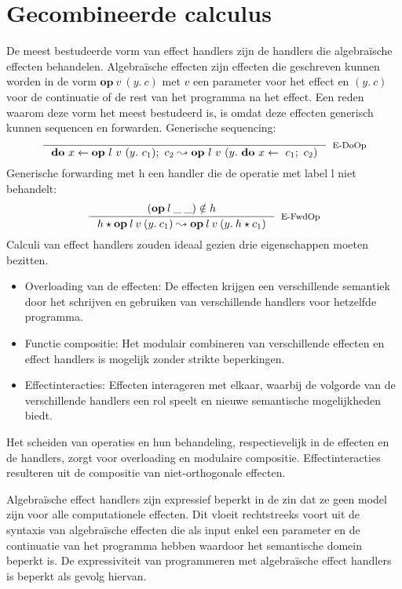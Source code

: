 \section{Gecombineerde calculus}
De meest bestudeerde vorm van effect handlers zijn de handlers die algebraïsche effecten behandelen\cite{Bauer2015}. Algebraïsche effecten zijn effecten die geschreven kunnen worden in de vorm $\textbf{op}\ v\ (y.\ c)$ met $v$ een parameter voor het effect en $(y. \  c)$ voor de continuatie of de rest van het programma na het effect. Een reden waarom deze vorm het meest bestudeerd is, is omdat deze effecten generisch kunnen sequencen en forwarden. \newline
Generische sequencing: 
\begin{equation}
    \inference{}{\textbf{do} \  x \leftarrow \textbf{op} \  l \  v \  (y. \  c_1); \   c_2 \leadsto \textbf{op} \  l \  v \  (y. \   \textbf{do} \  x \leftarrow \  c_1 ; \  c_2)}[E-DoOp]
\end{equation} 
Generische forwarding met h een handler die de operatie met label l niet behandelt:
\begin{equation}
    \inference{(\textbf{op}\:l\:\_\:\_) \notin h}{h \star \textbf{op}\:l\:v\:(y.\:c_{1}) \leadsto \textbf{op}\:l\:v\:(y.\: h \star c_{1})}[E-FwdOp]
\end{equation} 
Calculi van effect handlers zouden ideaal gezien drie eigenschappen moeten bezitten.
\begin{itemize}
    \item Overloading van de effecten: De effecten krijgen een verschillende semantiek door het schrijven en gebruiken van verschillende handlers voor hetzelfde programma.
    \item  Functie compositie: Het modulair combineren van verschillende effecten en effect handlers is mogelijk zonder strikte beperkingen.
    \item Effectinteracties: Effecten interageren met elkaar, waarbij de volgorde van de verschillende handlers een rol speelt en nieuwe semantische mogelijkheden biedt.
\end{itemize}

Het scheiden van operaties en hun behandeling, respectievelijk in de effecten en de handlers, zorgt voor overloading en modulaire compositie. Effectinteracties resulteren uit de compositie van niet-orthogonale effecten. \newline

Algebraïsche effect handlers zijn expressief beperkt in de zin dat ze geen model zijn voor alle computationele effecten. Dit vloeit rechtstreeks voort uit de syntaxis van algebraïsche effecten die als input enkel een parameter en de continuatie van het programma hebben waardoor het semantische domein beperkt is. De expressiviteit van programmeren met algebraïsche effect handlers is beperkt als gevolg hiervan. \newline

